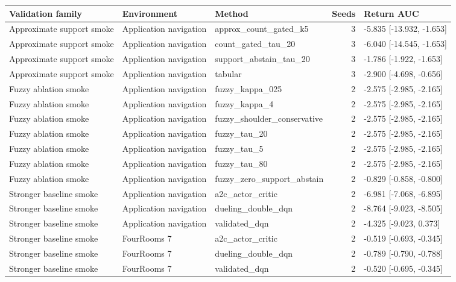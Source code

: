 \begin{tabular}{lllrl}
\toprule
Validation family & Environment & Method & Seeds & Return AUC \\
\midrule
Approximate support smoke & Application navigation & approx\_count\_gated\_k5 & 3 & -5.835 [-13.932, -1.653] \\
Approximate support smoke & Application navigation & count\_gated\_tau\_20 & 3 & -6.040 [-14.545, -1.653] \\
Approximate support smoke & Application navigation & support\_abstain\_tau\_20 & 3 & -1.786 [-1.922, -1.653] \\
Approximate support smoke & Application navigation & tabular & 3 & -2.900 [-4.698, -0.656] \\
Fuzzy ablation smoke & Application navigation & fuzzy\_kappa\_025 & 2 & -2.575 [-2.985, -2.165] \\
Fuzzy ablation smoke & Application navigation & fuzzy\_kappa\_4 & 2 & -2.575 [-2.985, -2.165] \\
Fuzzy ablation smoke & Application navigation & fuzzy\_shoulder\_conservative & 2 & -2.575 [-2.985, -2.165] \\
Fuzzy ablation smoke & Application navigation & fuzzy\_tau\_20 & 2 & -2.575 [-2.985, -2.165] \\
Fuzzy ablation smoke & Application navigation & fuzzy\_tau\_5 & 2 & -2.575 [-2.985, -2.165] \\
Fuzzy ablation smoke & Application navigation & fuzzy\_tau\_80 & 2 & -2.575 [-2.985, -2.165] \\
Fuzzy ablation smoke & Application navigation & fuzzy\_zero\_support\_abstain & 2 & -0.829 [-0.858, -0.800] \\
Stronger baseline smoke & Application navigation & a2c\_actor\_critic & 2 & -6.981 [-7.068, -6.895] \\
Stronger baseline smoke & Application navigation & dueling\_double\_dqn & 2 & -8.764 [-9.023, -8.505] \\
Stronger baseline smoke & Application navigation & validated\_dqn & 2 & -4.325 [-9.023, 0.373] \\
Stronger baseline smoke & FourRooms 7 & a2c\_actor\_critic & 2 & -0.519 [-0.693, -0.345] \\
Stronger baseline smoke & FourRooms 7 & dueling\_double\_dqn & 2 & -0.789 [-0.790, -0.788] \\
Stronger baseline smoke & FourRooms 7 & validated\_dqn & 2 & -0.520 [-0.695, -0.345] \\
\bottomrule
\end{tabular}
